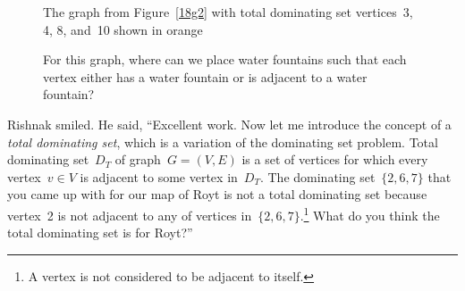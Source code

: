 \begin{figure}
\begin{center}

\caption{The graph from Figure~\ref{18g2} with total dominating set vertices~3, 4, 8, and~10 shown in orange}\label{18g4}
\end{center}
\end{figure}

\begin{figure}
\begin{center}

\caption{For this graph, where can we place water fountains such that each vertex either has a water fountain or is adjacent to a water fountain?}\label{18q1}
\end{center}
\end{figure}

Rishnak smiled. He said, ``Excellent work. Now let me introduce the concept of a \textit{total dominating set}, which is a variation of the dominating set problem. Total dominating set~$D_T$ of graph~$G=(V,E)$ is a set of vertices for which every vertex~$v\in V$ is adjacent to some vertex in~$D_T$. The dominating set~$\{2,6,7\}$ that you came up with for our map of Royt is not a total dominating set because vertex~2 is not adjacent to any of vertices in~$\{2,6,7\}$.\footnote{A vertex is not considered to be adjacent to itself.} What do you think the total dominating set is for Royt?'' 

